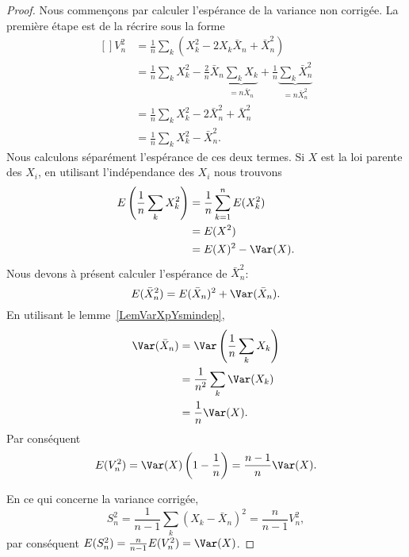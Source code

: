 \begin{proof}
	Nous commençons par calculer l'espérance de la variance non corrigée. La première étape est de la récrire sous la forme
	\begin{equation}
		\begin{aligned}[]
			V_n^2 & =\frac{1}{ n }\sum_k(X_k^2-2X_k\bar X_n+\bar X_n^2)                                                                                            \\
			      & =\frac{1}{ n }\sum_kX_k^2-\frac{ 2 }{ n }\bar X_n\underbrace{\sum_kX_k}_{=n\bar X_n}+\frac{1}{ n }\underbrace{\sum_k\bar X_n^2}_{=n\bar X_n^2} \\
			      & =\frac{1}{ n }\sum_kX_k^2-2\bar X_n^2+\bar X_n^2                                                                                               \\
			      & =\frac{1}{ n }\sum_kX_k^2-\bar X_n^2.
		\end{aligned}
	\end{equation}
	Nous calculons séparément l'espérance de ces deux termes. Si \( X\) est la loi parente des \( X_i\), en utilisant l'indépendance des \( X_i\) nous trouvons
	\begin{equation}
		\begin{aligned}[]
			E\left( \frac{1}{ n }\sum_kX_k^2 \right) & =\frac{1}{ n }\sum_{k=1}^nE(X_k^2) \\
			                                         & =E(X^2)                            \\
			                                         & =E(X)^2-\Var(X).
		\end{aligned}
	\end{equation}
	Nous devons à présent calculer l'espérance de \( \bar X_n^2\):
	\begin{equation}
		E(\bar X_n^2)=E(\bar X_n)^2+\Var(\bar X_n).
	\end{equation}
	En utilisant le lemme~\ref{LemVarXpYsmindep},
	\begin{subequations}
		\begin{align}
			\Var(\bar X_n) & =\Var\left( \frac{1}{ n }\sum_kX_k \right) \\
			               & =\frac{1}{ n^2 }\sum_k\Var(X_k)            \\
			               & =\frac{1}{ n }\Var(X).
		\end{align}
	\end{subequations}
	Par conséquent
	\begin{equation}
		E(V_n^2)=\Var(X)\left( 1-\frac{1}{ n } \right)=\frac{ n-1 }{ n }\Var(X).
	\end{equation}

	En ce qui concerne la variance corrigée,
	\begin{equation}
		S_n^2=\frac{1}{ n-1 }\sum_k(X_k-\bar X_n)^2=\frac{ n }{ n-1 }V_n^2,
	\end{equation}
	par conséquent \( E(S_n^2)=\frac{ n }{ n-1 }E(V_n^2)=\Var(X)\).
\end{proof}

